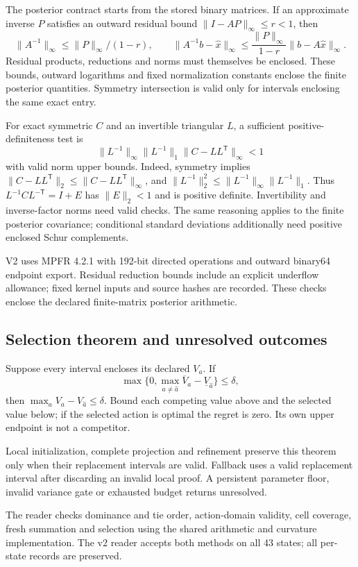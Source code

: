 The posterior contract starts from the stored binary matrices. If an approximate inverse $P$ satisfies an outward residual bound $\|I-AP\|_\infty\le r<1$, then
\[
\|A^{-1}\|_\infty\le\|P\|_\infty/(1-r),\qquad
\|A^{-1}b-\hat x\|_\infty
\le\frac{\|P\|_\infty}{1-r}\|b-A\hat x\|_\infty .
\]
Residual products, reductions and norms must themselves be enclosed. These bounds, outward logarithms and fixed normalization constants enclose the finite posterior quantities. Symmetry intersection is valid only for intervals enclosing the same exact entry.

For exact symmetric $C$ and an invertible triangular $L$, a sufficient positive-definiteness test is
\[
\|L^{-1}\|_\infty\|L^{-1}\|_1
                    \|C-LL^{\mathsf T}\|_\infty<1
\]
with valid norm upper bounds. Indeed, symmetry implies
$\|C-LL^{\mathsf T}\|_2\le\|C-LL^{\mathsf T}\|_\infty$,
and $\|L^{-1}\|_2^2\le\|L^{-1}\|_\infty\|L^{-1}\|_1$.
Thus $L^{-1}CL^{-\mathsf T}=I+E$ has $\|E\|_2<1$ and is positive definite. Invertibility and inverse-factor norms need valid checks. The same reasoning applies to the finite posterior covariance; conditional standard deviations additionally need positive enclosed Schur complements.

V2 uses MPFR 4.2.1 with 192-bit directed operations \citep{ref46} and outward binary64 endpoint export. Residual reduction bounds include an explicit underflow allowance; fixed kernel inputs and source hashes are recorded. These checks enclose the declared finite-matrix posterior arithmetic.

\subsection{Selection theorem and unresolved outcomes}

Suppose every interval encloses its declared $V_a$. If
\[
\max\{0,\max_{a\ne\hat a}\overline V_a-\underline V_{\hat a}\}\le\delta,
\]
then $\max_aV_a-V_{\hat a}\le\delta$. Bound each competing value above and the selected value below; if the selected action is optimal the regret is zero. Its own upper endpoint is not a competitor.

Local initialization, complete projection and refinement preserve this theorem only when their replacement intervals are valid. Fallback uses a valid replacement interval after discarding an invalid local proof. A persistent parameter floor, invalid variance gate or exhausted budget returns unresolved.

The reader checks dominance and tie order, action-domain validity, cell coverage, fresh summation and selection using the shared arithmetic and curvature implementation. The v2 reader accepts both methods on all 43 states; all per-state records are preserved.


